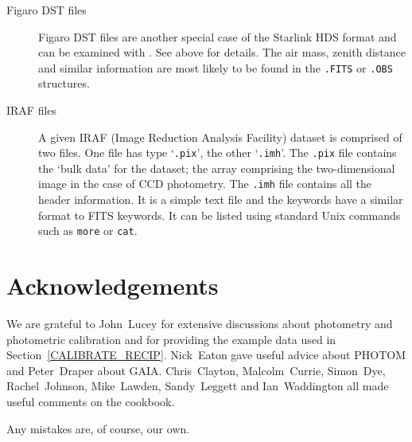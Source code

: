 \documentclass[twoside,11pt,nolof]{starlink}
\begin{document}
\begin{description}
  \item[Figaro DST files] Figaro DST files are another special case
   of the Starlink HDS format and can be examined with
   .  See above for details.  The air
   mass, zenith distance and similar information are most likely to be
   found in the \texttt{.FITS} or \texttt{.OBS} structures.

  \item[IRAF files] A given IRAF (Image Reduction Analysis Facility)
   dataset is comprised of two files.  One file has type `\texttt{.pix}',
   the other `\texttt{.imh}'.  The \texttt{.pix} file contains the `bulk
   data' for the dataset; the array comprising the two-dimensional
   image in the case of CCD photometry.  The \texttt{.imh} file contains
   all the header information.  It is a simple text file and the
   keywords have a similar format to FITS keywords.  It can be listed
   using standard Unix commands such as \texttt{more} or \texttt{cat}.

\end{description}


\newpage
{}
\section*{Acknowledgements}

We are grateful to John~Lucey for extensive discussions about photometry
and photometric calibration and for providing the example data used in
Section~\ref{CALIBRATE_RECIP}.  Nick~Eaton gave useful advice about
PHOTOM and Peter~Draper about GAIA.  Chris~Clayton, Malcolm~Currie,
Simon~Dye, Rachel~Johnson, Mike~Lawden, Sandy~Leggett and Ian~Waddington
all made useful comments on the cookbook.

Any mistakes are, of course, our own.



% 

\end{document}
